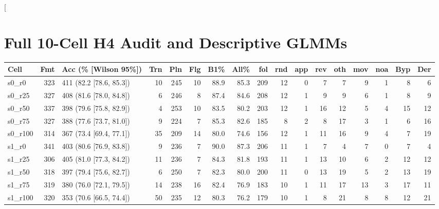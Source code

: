 \documentclass[11pt]{article}
\begin{document}
{\let\origbibitem\bibitem
\renewcommand{\bibitem}[2][]{\ifstrequal{#2}{wang2026case}{\newpage}{}\origbibitem[#1]{#2}}%
}

\clearpage
\appendix

\twocolumn[{%
\section{Full 10-Cell H4 Audit and Descriptive GLMMs}
\label{app:tables}
\vspace{4pt}
\begingroup
\centering
\footnotesize
\setlength{\tabcolsep}{0pt}
\begin{tabular*}{\textwidth}{@{\extracolsep{\fill}}lrlrrrrrrrrrrrrrr@{}}
\toprule
\textbf{Cell} & \textbf{Fmt} & \textbf{Acc (\% [Wilson 95\%])} & \textbf{Trn} & \textbf{Pln} & \textbf{Flg} & \textbf{B1\%} & \textbf{All\%} & \textbf{fol} & \textbf{rnd} & \textbf{app} & \textbf{rev} & \textbf{oth} & \textbf{mov} & \textbf{noa} & \textbf{Byp} & \textbf{Der} \\
\midrule
s0\_r0   & 323 & 411 (82.2 [78.6, 85.3]) & 10 & 245 & 10 & 88.9 & 85.3 & 209 & 12 & 0 &  7 &  7 &  9 & 1 &  8 &  6 \\
s0\_r25  & 327 & 408 (81.6 [78.0, 84.8]) &  6 & 246 &  8 & 87.4 & 84.6 & 208 & 12 & 1 &  9 &  9 &  6 & 1 &  8 &  9 \\
s0\_r50  & 337 & 398 (79.6 [75.8, 82.9]) &  4 & 253 & 10 & 83.5 & 80.2 & 203 & 12 & 1 & 16 & 12 &  5 & 4 & 15 & 12 \\
s0\_r75  & 327 & 388 (77.6 [73.7, 81.0]) &  9 & 224 &  7 & 85.3 & 82.6 & 185 &  8 & 2 &  8 & 17 &  3 & 1 &  6 & 16 \\
s0\_r100 & 314 & 367 (73.4 [69.4, 77.1]) & 35 & 209 & 14 & 80.0 & 74.6 & 156 & 12 & 1 & 11 & 16 &  9 & 4 &  7 & 19 \\
\midrule
s1\_r0   & 341 & 403 (80.6 [76.9, 83.8]) &  9 & 236 &  7 & 90.0 & 87.3 & 206 & 11 & 1 &  7 &  4 &  7 & 0 &  7 &  4 \\
s1\_r25  & 306 & 405 (81.0 [77.3, 84.2]) & 11 & 236 &  7 & 84.3 & 81.8 & 193 & 11 & 1 & 13 & 10 &  6 & 2 & 12 & 12 \\
s1\_r50  & 318 & 397 (79.4 [75.6, 82.7]) &  6 & 250 &  7 & 82.3 & 80.0 & 200 & 11 & 0 & 13 & 19 &  5 & 2 & 13 & 19 \\
s1\_r75  & 319 & 380 (76.0 [72.1, 79.5]) & 14 & 238 & 16 & 82.4 & 76.9 & 183 & 10 & 1 & 11 & 17 & 13 & 3 & 17 & 11 \\
s1\_r100 & 320 & 353 (70.6 [66.5, 74.4]) & 50 & 235 & 12 & 80.3 & 76.2 & 179 & 10 & 1 &  8 & 21 &  8 & 8 & 12 & 21 \\

\end{tabular*}}
\end{document}
